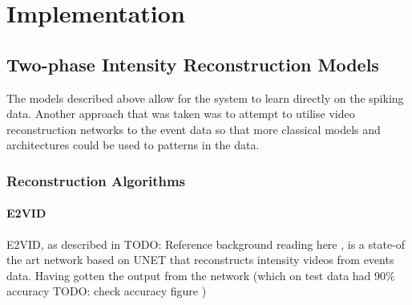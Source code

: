\chapter{Implementation} \label{chap:implementation}




\section{Two-phase Intensity Reconstruction Models}

The models described above allow for the system to learn directly on the spiking data. Another approach that was taken was to attempt to utilise video reconstruction networks to the event data so that more classical models and architectures could be used to patterns in the data.

\subsection{Reconstruction Algorithms}

\subsubsection{E2VID}

E2VID, as described in \color{red} TODO: Reference background reading here \color{black}, is a state-of the art network based on UNET that reconstructs intensity videos from events data. Having gotten the output from the network (which on test data had 90\% accuracy \color{red} TODO: check accuracy figure \color{black})

